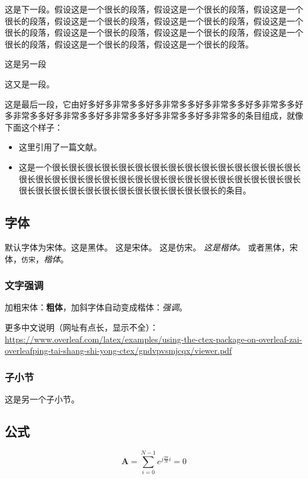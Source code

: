 \documentclass[12pt]{article} %
\begin{document}
这是下一段。假设这是一个很长的段落，假设这是一个很长的段落，假设这是一个很长的段落，假设这是一个很长的段落，假设这是一个很长的段落，假设这是一个很长的段落，假设这是一个很长的段落，假设这是一个很长的段落，假设这是一个很长的段落，假设这是一个很长的段落，假设这是一个很长的段落。

这是另一段

这又是一段。

这是最后一段，它由好多好多非常多多好多非常多多好多非常多多好多非常多多好多非常多多好多非常多多好多非常多多好多非常多多好多非常多的条目组成，就像下面这个样子：

\begin{itemize}
  \item 这里引用了一篇文献\cite{cao17}。
  \item 这是一个很长很长很长很长很长很长很长很长很长很长很长很长很长很长很长很长很长很长很长很长很长很长很长很长很长很长很长很长很长很长很长很长很长很长很长很长很长很长很长很长很长很长很长很长的条目。
\end{itemize}

\subsection{字体}
默认字体为宋体。{\sffamily 这是黑体。} {\rmfamily 这是宋体。} {\ttfamily 这是仿宋。} {\it 这是楷体。}
或者\textsf{黑体}，\textrm{宋体}，\texttt{仿宋}，\textit{楷体}。

\subsubsection{文字强调}
加粗宋体：\textbf{粗体}，加斜字体自动变成楷体：\textit{强调}。

更多中文说明（网址有点长，显示不全）：\\\url{https://www.overleaf.com/latex/examples/using-the-ctex-package-on-overleaf-zai-overleafping-tai-shang-shi-yong-ctex/gndvpvsmjcqx/viewer.pdf}

\subsubsection{子小节}
这是另一个子小节。

\subsection{公式}
\begin{equation}
\label{eqn:eqn1}
\mathbf{A}=\sum\limits_{i=0}^{N-1}{e^{j\frac{2\pi}{N}i}}=0
\end{equation}
\end{document}
